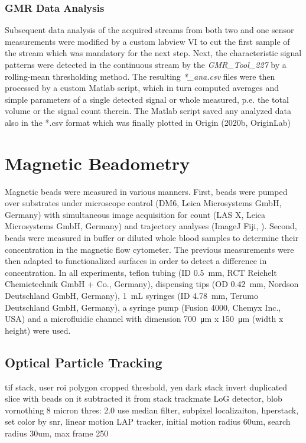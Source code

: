 \subsubsection{GMR Data Analysis} \label{sec:meth:gmrDataAnalysis}
Subsequent data analysis of the acquired streams from both two and one sensor measurements were modified by a custom labview VI to cut the first sample of the stream which was mandatory for the next step. Next, the characteristic signal patterns were detected in the continuous stream by the \textit{GMR\_Tool\_227} by a rolling-mean thresholding method. The resulting \textit{*\_ana.csv} files were then processed by a custom Matlab script, which in turn computed averages and simple parameters of a single detected signal or whole measured, p.e. the total volume or the signal count therein. The Matlab script saved any analyzed data also in the *.csv format which was finally plotted in Origin (2020b, OriginLab)

\section{Magnetic Beadometry}
Magnetic beads were measured in various manners. First, beads were pumped over substrates under microscope control (DM6, Leica Microsystems GmbH, Germany) with simultaneous image acquisition for count (LAS X, Leica Microsystems GmbH, Germany) and trajectory analyses (ImageJ Fiji, \cite{lit:chem:Fiji}). Second, beads were measured in buffer or diluted whole blood samples to determine their concentration in the magnetic flow cytometer. The previous measurements were then adapted to functionalized surfaces in order to detect a difference in concentration. In all experiments, teflon tubing (ID \SI{0.5}{\milli\meter}, RCT Reichelt Chemietechnik GmbH + Co., Germany), dispensing tips (OD \SI{0.42}{\milli\meter}, Nordson Deutschland GmbH, Germany), \SI{1}{\milli\liter} syringes (ID \SI{4.78}{\milli\meter}, Terumo Deutschland GmbH, Germany), a syringe pump (Fusion 4000, Chemyx Inc., USA) and a microfluidic channel with dimension \SI{700}{\micro\meter} x \SI{150}{\micro\meter} (width x height) were used.

\subsection{Optical Particle Tracking}
tif stack,
user roi polygon 
cropped
threshold, yen dark stack
invert
duplicated slice with beads on it
subtracted it from stack
trackmate
LoG detector, blob vornothing 8 micron
thres: 2.0
use median filter, subpixel localizaiton, hperstack, set color by snr, 
linear motion LAP tracker, initial motion radius 60um, search radius 30um, max frame 250


